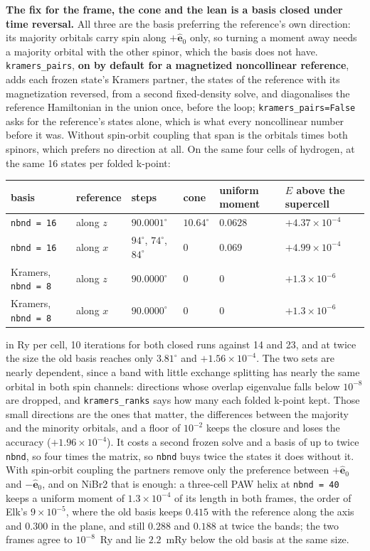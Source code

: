 \documentclass[11pt,a4paper]{article}
\newcommand{\code}[1]{\texttt{\small #1}}
\begin{document}
\textbf{The fix for the frame, the cone and the lean is a basis closed under
time reversal.} All three are the basis preferring the reference's own
direction: its majority orbitals carry spin along $+\hat{\mathbf e}_0$ only, so
turning a moment away needs a majority orbital with the other spinor, which the
basis does not have. \code{kramers\_pairs}, \textbf{on by default for a
magnetized noncollinear reference}, adds each frozen state's Kramers partner,
the states of the reference with its magnetization reversed, from a second
fixed-density solve, and diagonalises the reference Hamiltonian in the union
once, before the loop; \code{kramers\_pairs=False} asks for the reference's
states alone, which is what every noncollinear number before it was. Without spin-orbit coupling that span is the
orbitals times both spinors, which prefers no direction at all. On the same four
cells of hydrogen, at the same 16 states per folded k-point:

\begin{center}
\begin{tabular}{llllll}
basis & reference & steps & cone & uniform moment & $E$ above the supercell \\
\hline
\code{nbnd = 16} & along $z$ & $90.0001^\circ$ & $10.64^\circ$ & $0.0628$ & $+4.37\times10^{-4}$ \\
\code{nbnd = 16} & along $x$ & $94^\circ$, $74^\circ$, $84^\circ$ & $0$ & $0.069$ & $+4.99\times10^{-4}$ \\
Kramers, \code{nbnd = 8} & along $z$ & $90.0000^\circ$ & $0$ & $0$ & $+1.3\times10^{-6}$ \\
Kramers, \code{nbnd = 8} & along $x$ & $90.0000^\circ$ & $0$ & $0$ & $+1.3\times10^{-6}$ \\
\end{tabular}
\end{center}

in Ry per cell, 10 iterations for both closed runs against 14 and 23, and at
twice the size the old basis reaches only $3.81^\circ$ and $+1.56\times10^{-4}$.
The two sets are nearly dependent, since a band with little exchange splitting
has nearly the same orbital in both spin channels: directions whose overlap
eigenvalue falls below $10^{-8}$ are dropped, and \code{kramers\_ranks} says how
many each folded k-point kept. Those small directions are the ones that matter,
the differences between the majority and the minority orbitals, and a floor of
$10^{-2}$ keeps the closure and loses the accuracy ($+1.96\times10^{-4}$). It
costs a second frozen solve and a basis of up to twice \code{nbnd}, so four times
the matrix, so \code{nbnd} buys twice the states it does without it. With
spin-orbit coupling the partners remove only the preference
between $+\hat{\mathbf e}_0$ and $-\hat{\mathbf e}_0$, and on NiBr2 that is
enough: a three-cell PAW helix at \code{nbnd = 40} keeps a uniform moment of
$1.3\times10^{-4}$ of its length in both frames, the order of Elk's
$9\times10^{-5}$, where the old basis keeps $0.415$ with the reference along the
axis and $0.300$ in the plane, and still $0.288$ and $0.188$ at twice the bands; the two frames agree to $10^{-8}$~Ry and lie
$2.2$~mRy below the old basis at the same size.
\end{document}
